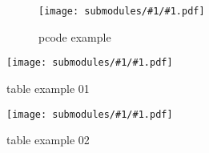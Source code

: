 \documentclass[conference]{IEEEtran}
\begin{document}
\newcommand{\includeSubmodule}[3]{
    \begin{figure#3}[!htb]
        \begin{center}
            \texttt{[image: submodules/\#1/\#1.pdf]}
        \end{center} 
        \caption{#2}
    \end{figure#3}
}

\lipsum[1-5]
\includeSubmodule{4}{pcode example}{}
\includeSubmodule{5}{table example 01}{*}
\lipsum[1-5]
\includeSubmodule{6}{table example 02}{*}
\lipsum[1-5]



\end{document}

